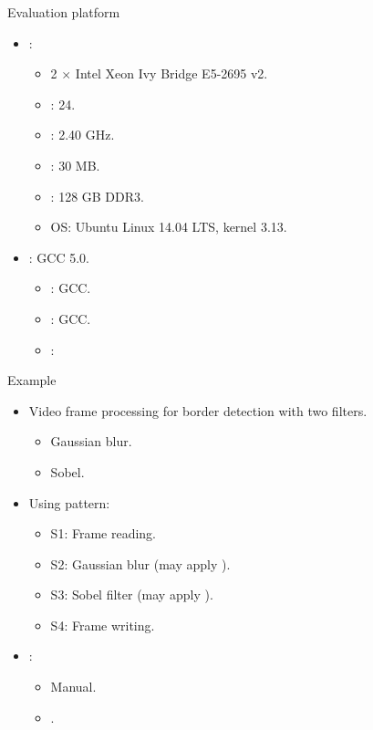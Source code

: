 \begin{frame}[t]{Evaluation platform}
\begin{itemize}
  \item {}:
    \begin{itemize}
      \item 2 $\times$ Intel Xeon Ivy Bridge E5-2695 v2.
      \item {}: 24.
      \item {}: 2.40 GHz.
      \item {}: 30 MB.
      \item {}: 128 GB DDR3.
      \item OS: Ubuntu Linux 14.04 LTS, kernel 3.13.
    \end{itemize}

  \vfill
  \item {}: GCC 5.0.
    \begin{itemize}
      \item {}: GCC.
      \item {}: GCC.
      \item {}: 
    \end{itemize}
\end{itemize}
\end{frame}

\begin{frame}[t]{Example}
\begin{itemize}
  \item Video frame processing for border detection with two filters.
    \begin{itemize}
      \item Gaussian blur.
      \item Sobel.
    \end{itemize}
  \vfill\pause
  \item Using  pattern:
    \begin{itemize}
      \item S1: Frame reading.
      \item S2: Gaussian blur (may apply ).
      \item S3: Sobel filter (may apply ).
      \item S4: Frame writing.
    \end{itemize}
  \vfill\pause
  \item {}:
    \begin{itemize}
      \item Manual.
      \item {}.
    \end{itemize}
\end{itemize}
\end{frame}

